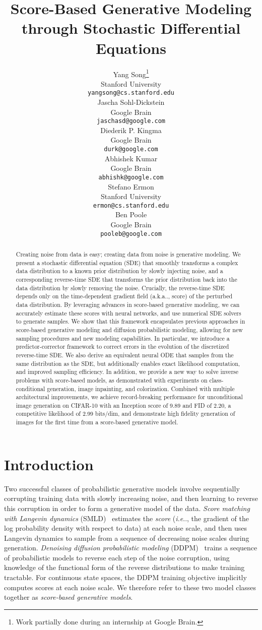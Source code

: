 \documentclass{article} \usepackage{iclr2021_conference,times}
\title{Score-Based Generative Modeling through Stochastic Differential Equations}
\author{Yang Song\thanks{Work partially done during an internship at Google Brain.}\\
Stanford University\\
\texttt{yangsong@cs.stanford.edu}\\
\And 
Jascha Sohl-Dickstein\\
Google Brain\\
\texttt{jaschasd@google.com}\\
\And
Diederik P. Kingma \\
Google Brain\\
\texttt{durk@google.com}\\
\AND
Abhishek Kumar \\
Google Brain\\
\texttt{abhishk@google.com}\\
\And 
Stefano Ermon \\
Stanford University\\
\texttt{ermon@cs.stanford.edu}\\
\And
Ben Poole\\
Google Brain\\
\texttt{pooleb@google.com}
}
\makeatletter
\def\@onedot{\ifx\@let@token.\else.\null\fi\xspace}
\DeclareRobustCommand\onedot{\futurelet\@let@token\@onedot}
\def\ie{\emph{i.e}\onedot}
\def\aka{a.k.a\onedot}
\makeatother
\begin{document}
\maketitle

\begin{abstract}
Creating noise from data is easy; creating data from noise is generative modeling. We present a stochastic differential equation (SDE) that smoothly transforms a complex data distribution to a known prior distribution by slowly injecting noise, and a corresponding reverse-time SDE that transforms the prior distribution back into the data distribution by slowly removing the noise. 
Crucially, the reverse-time SDE depends only on the time-dependent gradient field (\aka, score) of the perturbed data distribution. By leveraging advances in score-based generative modeling, we can accurately estimate these scores with neural networks, and use numerical SDE solvers to generate samples. We show that this framework encapsulates previous approaches in score-based generative modeling and diffusion probabilistic modeling, allowing for new sampling procedures and new modeling capabilities. In particular, we introduce a predictor-corrector framework to correct errors in the evolution of the discretized reverse-time SDE. We also derive an equivalent neural ODE that samples from the same distribution as the SDE, but additionally enables exact likelihood computation, and improved sampling efficiency. In addition, we provide a new way to solve inverse problems with score-based models, 
as demonstrated with experiments on class-conditional generation, image inpainting, and colorization. Combined with multiple architectural improvements, we achieve record-breaking performance for unconditional image generation on CIFAR-10 with an Inception score of 9.89 and FID of 2.20, a competitive likelihood of 2.99 bits/dim, and demonstrate high fidelity generation of  images for the first time from a score-based generative model.
\end{abstract} \section{Introduction}



Two successful classes of probabilistic generative models involve sequentially corrupting training data with slowly increasing noise, and then learning to reverse this corruption in order to form a generative model of the data. 
\emph{Score matching with Langevin dynamics} (SMLD)~\citep{song2019generative} estimates the \emph{score} (\ie, the gradient of the log probability density with respect to data) at each noise scale, and then uses Langevin dynamics to sample from a sequence of decreasing noise scales during generation. 
\emph{Denoising diffusion probabilistic modeling} (DDPM)~\citep{sohl2015deep,ho2020denoising} trains a sequence of probabilistic models to reverse each step of the noise corruption, 
using knowledge of the functional form of the reverse distributions to make training tractable. 
For continuous state spaces, the DDPM training objective implicitly computes 
scores at each noise scale. 
We therefore refer to these two model classes together as \emph{score-based generative models}. 
\end{document}
